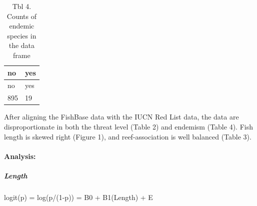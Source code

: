 \documentclass[
  letterpaper,
  DIV=11,
  numbers=noendperiod]{scrartcl}
\let\oldparagraph\paragraph
\renewcommand{\paragraph}[1]{\oldparagraph{#1}\mbox{}}
\let\oldsubparagraph\subparagraph
\renewcommand{\subparagraph}[1]{\oldsubparagraph{#1}\mbox{}}
\begin{document}
\begin{longtable}[]{@{}ll@{}}
\caption{Tbl 4. Counts of endemic species in the data
frame}\tabularnewline
\toprule()
no & yes \\
\midrule()
\endfirsthead
\toprule()
no & yes \\
\midrule()
\endhead
895 & 19 \\
\bottomrule()
\end{longtable}

After aligning the FishBase data with the IUCN Red List data, the data
are disproportionate in both the threat level (Table 2) and endemism
(Table 4). Fish length is skewed right (Figure 1), and reef-association
is well balanced (Table 3).

\hypertarget{analysis}{%
\paragraph{Analysis:}\label{analysis}}

\hypertarget{length}{%
\subparagraph{\texorpdfstring{\textbf{Length}}{Length}}\label{length}}

logit(p) = log(p/(1-p)) = B0 + B1(Length) + E
\end{document}
